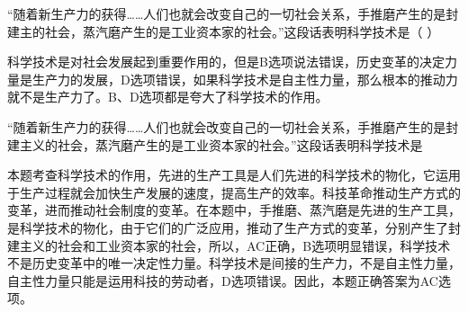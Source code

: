 \question ``随着新生产力的获得\ldots{}\ldots{}人们也就会改变自己的一切社会关系，手推磨产生的是封建主的社会，蒸汽磨产生的是工业资本家的社会。''这段话表明科学技术是（
）
\par{}
\begin{solution}科学技术是对社会发展起到重要作用的，但是B选项说法错误，历史变革的决定力量是生产力的发展，D选项错误，如果科学技术是自主性力量，那么根本的推动力就不是生产力了。B、D选项都是夸大了科学技术的作用。
\end{solution}
\question ``随着新生产力的获得\ldots{}\ldots{}人们也就会改变自己的一切社会关系，手推磨产生的是封建主义的社会，蒸汽磨产生的是工业资本家的社会。''这段话表明科学技术是
\par{}
\begin{solution}本题考查科学技术的作用，先进的生产工具是人们先进的科学技术的物化，它运用于生产过程就会加快生产发展的速度，提高生产的效率。科技革命推动生产方式的变革，进而推动社会制度的变革。在本题中，手推磨、蒸汽磨是先进的生产工具，是科学技术的物化，由于它们的广泛应用，推动了生产方式的变革，分别产生了封建主义的社会和工业资本家的社会，所以，AC正确，B选项明显错误，科学技术不是历史变革中的唯一决定性力量。科学技术是间接的生产力，不是自主性力量，自主性力量只能是运用科技的劳动者，D选项错误。因此，本题正确答案为AC选项。
\end{solution}
